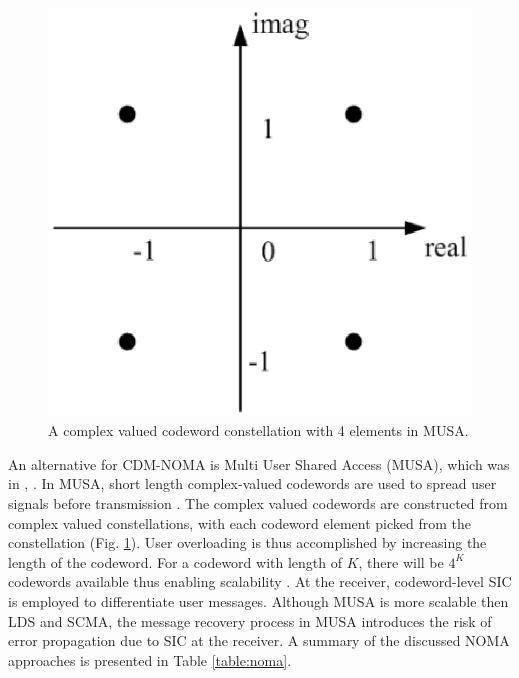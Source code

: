 \begin{figure} [!htpb]
\centering
\vspace{-0.6in}
\includegraphics [width=1\columnwidth]{chap2_fig/NOMA_fig2.eps}  %
\vspace{-1.5in}
\caption{A complex valued codeword constellation with 4 elements in MUSA. \cite{yuan2016multi}}
\label{fig:noma_fig2}
\end{figure}

An alternative for CDM-NOMA is Multi User Shared Access (MUSA), which was  in \cite{dai2015non}, \cite{yuan2016multi}. In MUSA, short length complex-valued codewords are used to spread user signals before transmission  \cite{yuan2016multi}. The complex valued codewords are constructed from complex valued constellations, with each codeword element picked from the constellation (Fig. \ref{fig:noma_fig2}). User overloading is thus accomplished by increasing the length of the codeword. For a codeword with length of $K$, there will be $4^K$ codewords available thus enabling scalability \cite{yuan2016non}. At the receiver, codeword-level SIC is employed to differentiate user messages. Although MUSA is more scalable then LDS and SCMA, the message recovery process in MUSA introduces the risk of error propagation due to SIC at the receiver. A summary of the discussed NOMA approaches is presented in Table \ref{table:noma}.


